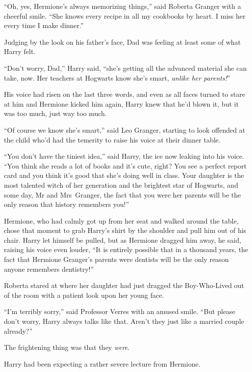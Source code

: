 “Oh, yes, Hermione’s always memorizing things,” said Roberta Granger with a cheerful smile.
“She knows every recipe in all my cookbooks by heart. I miss her every time I make dinner.”

Judging by the look on his father’s face, Dad was feeling at least some of what Harry felt.

“Don’t worry, Dad,” Harry said, “she’s getting all the advanced material she can take, now. Her teachers at Hogwarts know she’s smart, \emph{unlike her parents!}”

His voice had risen on the last three words, and even as all faces turned to stare at him and Hermione kicked him again, Harry knew that he’d blown it, but it was too much, just way too much.

“Of course we know she’s smart,” said Leo Granger, starting to look offended at the child who’d had the temerity to raise his voice at their dinner table.

“You don’t have the tiniest idea,” said Harry, the ice now leaking into his voice.
“You think she reads a lot of books and it’s cute, right? You see a perfect report card and you think it’s good that she’s doing well in class. Your daughter is the most talented witch of her generation and the brightest star of Hogwarts, and some day, Mr and Mrs~Granger, the fact that you were her parents will be the only reason that history remembers you!”

Hermione, who had calmly got up from her seat and walked around the table, chose that moment to grab Harry’s shirt by the shoulder and pull him out of his chair. Harry let himself be pulled, but as Hermione dragged him away, he said, raising his voice even louder,
“It is entirely possible that in a thousand years, the fact that Hermione Granger’s parents were dentists will be the only reason anyone remembers dentistry!”

\later

Roberta stared at where her daughter had just dragged the Boy-Who-Lived out of the room with a patient look upon her young face.

“I’m terribly sorry,” said Professor Verres with an amused smile.
“But please don’t worry, Harry always talks like that. Aren’t they just like a married couple already?”

The frightening thing was that they \emph{were}.

\later

Harry had been expecting a rather severe lecture from Hermione.

